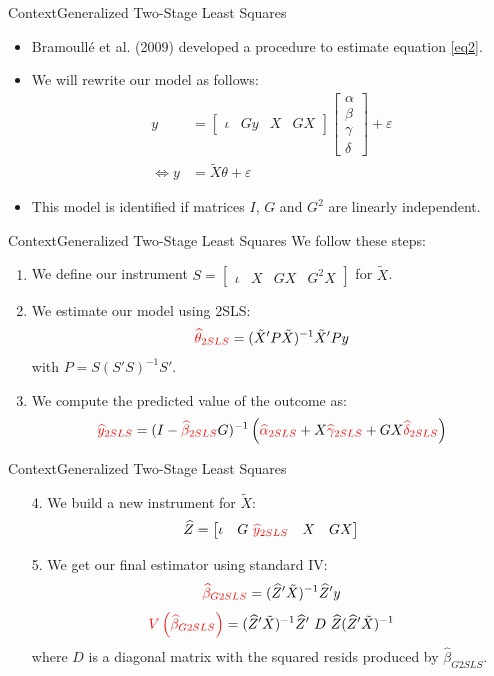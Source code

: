\documentclass[aspectratio=169]{beamer}
\begin{document}
\begin{frame}{Context}{Generalized Two-Stage Least Squares}
\begin{itemize}
\item Bramoullé et al. (2009) developed a procedure to estimate equation \eqref{eq2}.
\pause
\item We will rewrite our model as follows:
\begin{align*}
y & = \begin{bmatrix} \iota & Gy & X & GX \end{bmatrix} \begin{bmatrix} \alpha \\ \beta \\ \gamma \\ \delta  \end{bmatrix} + \varepsilon \\
\Leftrightarrow y & = \tilde{X} \theta + \varepsilon
\end{align*}
\item This model is identified if matrices $I$, $G$ and $G^2$ are linearly independent.
\end{itemize}
\end{frame}

\begin{frame}{Context}{Generalized Two-Stage Least Squares}
We follow these steps:
\begin{enumerate}
\item We define our instrument $ S = \begin{bmatrix} \iota & X & GX & G^2X \end{bmatrix} $ for $\tilde{X}$.
\pause
\item We estimate our model using 2SLS: 
$$\textcolor{red}{\hat{\theta}_{2SLS}}= (\tilde{X}' P \tilde{X})^{-1} \tilde{X}' P y  $$
with $P=S (S'S)^{-1} S'$.
\pause
\item We compute the predicted value of the outcome as:
$$ \textcolor{red}{\hat{y}_{2SLS}} = (I- \textcolor{red}{\hat{\beta}_{2SLS}} G)^{-1} \left(\textcolor{red}{\hat{\alpha}_{2SLS}}  + X \textcolor{red}{\hat{\gamma}_{2SLS}}  +  G X \textcolor{red}{\hat{\delta}_{2SLS}}  \right) $$
\end{enumerate}
\end{frame}


\begin{frame}{Context}{Generalized Two-Stage Least Squares}
\begin{itemize}
\item[4.] We build a new instrument for $\tilde{X}$:
$$\hat{Z}=\begin{bmatrix} \iota & G \ \textcolor{red}{\hat{y}_{2SLS}} & X & GX \end{bmatrix}$$
\pause 
\item[5.] We get our final estimator using standard IV:
$$ \textcolor{red}{\hat{\beta}_{G2SLS}} = (\hat{Z}'\tilde{X})^{-1} \hat{Z}'y$$
$$ \textcolor{red}{V\left(\hat{\beta}_{G2SLS}\right)} = (\hat{Z}'\tilde{X})^{-1} \hat{Z}'\ D \ \hat{Z} (\hat{Z}'\tilde{X})^{-1}$$
where $D$ is a diagonal matrix with the squared resids produced by $\hat{\beta}_{G2SLS}$.
\end{itemize}
\end{frame}
\end{document}
